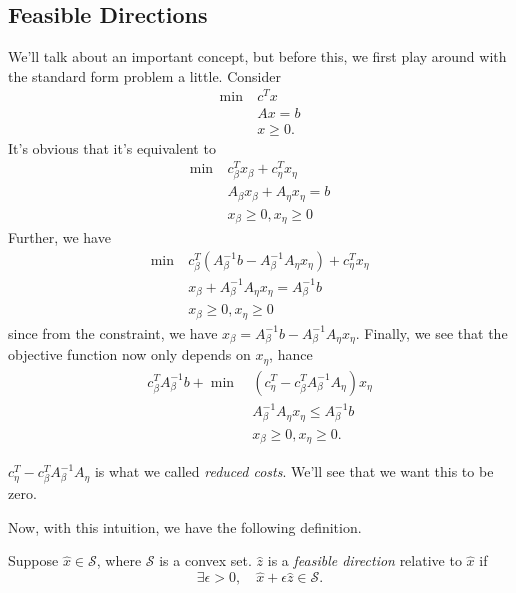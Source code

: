 \subsection{Feasible Directions}
We'll talk about an important concept, but before this, we first play around with the standard form problem a little. Consider
\begin{align*}
	\min~ & c^Tx     \\
	      & Ax = b   \\
	      & x\geq 0.
\end{align*}
It's obvious that it's equivalent to
\begin{align*}
	\min~ & c^{T}_{\beta}x_{\beta} + c^{T}_{\eta}x_{\eta} \\
	      & A_{\beta}x_{\beta} + A_{\eta}x_{\eta} = b     \\
	      & x_{\beta}\geq 0, x_{\eta}\geq 0
\end{align*}
Further, we have
\begin{align*}
	\min~ & c^{T}_{\beta}(A^{-1}_{\beta}b - A^{-1}_{\beta}A_{\eta}x_{\eta} ) + c_{\eta}^{T}x_{\eta} \\
	      & x_{\beta} + A^{-1}_{\beta}A_{\eta}x_{\eta} = A^{-1}_{\beta}b                            \\
	      & x_{\beta}\geq 0, x_{\eta}\geq 0
\end{align*}
since from the constraint, we have \(x_{\beta} = A^{-1}_{\beta}b - A^{-1}_{\beta}A_{\eta}x_{\eta}\). Finally, we see that the objective function now
only depends on \(x_{\eta}\), hance
\begin{align*}
	c^{T}_{\beta}A^{-1}_{\beta}b + \min~ & (c_{\eta}^{T} - c_{\beta}^{T}A^{-1}_{\beta}A_{\eta})x_{\eta} \\
	                                     & A^{-1}_{\beta}A_{\eta}x_{\eta} \leq A^{-1}_{\beta}b          \\
	                                     & x_{\beta}\geq 0, x_{\eta}\geq 0.
\end{align*}

\begin{note}
	\(c_{\eta}^{T} - c_{\beta}^{T}A^{-1}_{\beta}A_{\eta}\) is what we called \emph{reduced costs}. We'll see that we want this to be zero.
\end{note}

Now, with this intuition, we have the following definition.
\begin{definition}
	Suppose \(\hat{x}\in \mathcal{S}\), where \(\mathcal{S}\) is a convex set. \(\hat{z}\) is a \emph{feasible direction} relative to \(\hat{x}\) if
	\[
		\exists \epsilon>0,\quad \hat{x}+\epsilon \hat{z} \in \mathcal{S}.
	\]
\end{definition}

